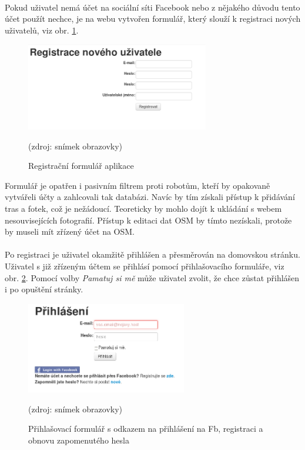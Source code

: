 \documentclass[11pt,a4paper,titlepage,oneside]{book}
\begin{document}
						\paragraph{}Pokud uživatel nemá účet na sociální síti Facebook nebo z nějakého důvodu tento účet použít nechce, je na webu vytvořen formulář, který slouží k registraci nových uživatelů, viz obr.  \ref{fig:regForm}.
		\begin{figure}[!h]
			\begin{center}
				\includegraphics[width=8cm]{obrazky/toulavej/regForm.png}
				\caption{Registrační formulář aplikace }
				\label{fig:regForm}
				(zdroj: snímek obrazovky)
			\end{center}
		\end{figure}	
 Formulář je opatřen i pasivním filtrem proti robotům, kteří by opakovaně vytvářeli účty a zahlcovali tak databázi. Navíc by tím získali přístup k přidávání tras a fotek, což je nežádoucí. Teoreticky by mohlo dojít k ukládání s webem nesouvisejících fotografií. Přístup k editaci dat \ac{OSM} by tímto nezískali, protože by museli mít zřízený účet na \acl{OSM}. 

					\paragraph{}Po registraci je uživatel okamžitě přihlášen a přesměrován na domovskou stránku. Uživatel s již zřízeným účtem se přihlásí pomocí přihlašovacího formuláře, viz obr. \ref{fig:login}. Pomocí volby \textit{Pamatuj si mě} může uživatel zvolit, že chce zůstat přihlášen i po opuštění stránky.
		\begin{figure}[!h]
			\begin{center}
				\includegraphics[width=7cm]{obrazky/toulavej/login.png}
				\caption{Přihlašovací formulář s odkazem na přihlášení na \ac{Fb}, registraci a obnovu zapomenutého hesla}
				\label{fig:login}
				(zdroj: snímek obrazovky)
			\end{center}
		\end{figure}	
\end{document}
